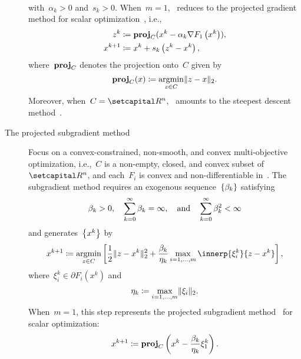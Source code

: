 \documentclass[../../main]{subfiles}
\begin{document}
\begin{example}
\begin{description}
\begin{equation}
\begin{aligned}
                \end{aligned}
            \end{equation} 
            with~$\alpha_k > 0$ and~$s_k > 0$.
            When~$m = 1$,~ reduces to the projected gradient method for scalar optimization~\cite{Polyak1963,Goldstein1964,Goldstein1967,McCormick1969}, i.e.,
            \begin{equation}
                \begin{aligned}
                    z^k &\coloneqq \proj_C (x^k - \alpha_k \nabla F_1\left(x^k\right)), \\
                    x^{k + 1} &\coloneqq x^k + s_k \left( z^k - x^k \right)
                ,\end{aligned}
            \end{equation} 
            where~$\proj_C$ denotes the projection onto~$C$ given by
            \begin{equation} \label{eq:proj}
                \proj_C(x) \coloneqq \argmin_{z \in C} \norm{z - x}_2
            .\end{equation} 
            Moreover, when~$C = \setR^n$,~ amounts to the steepest descent method~.
        \item[The projected subgradient method~\cite{Bello-Cruz2013}]
            Focus on a convex-constrained, non-smooth, and convex multi-objective optimization, i.e.,~$C$ is a non-empty, closed, and convex subset of~$\setR^n$, and each~$F_i$ is convex and non-differentiable in~.
            The subgradient method requires an exogenous sequence~$\set{\beta_k}$ satisfying
            \begin{equation}
                \beta_k > 0, \quad \sum_{k = 0}^{\infty} \beta_k = \infty, \eqand \sum_{k = 0}^{\infty} \beta_k^2 < \infty 
            \end{equation} 
            and generates~$\set*{x^k}$ by
            \begin{equation}
                    x^{k + 1} \coloneqq \argmin_{z \in C} \left[ \frac{1}{2} \norm{z - x^k}_2^2 + \frac{\beta_k}{\eta_k} \max_{i = 1, \dots, m} \innerp{\xi^k_i}{z - x^k} \right] 
            ,\end{equation} 
            where~$\xi^k_i \in \partial F_i\left(x^k\right)$ and
            \begin{equation}
                \eta_k \coloneqq \max_{i = 1, \dots, m} \norm{\xi_i}_2
            .\end{equation} 
            When~$m = 1$, this step represents the projected subgradient method~\cite{Polyak1967,Polyak1969,Shor1985,Alber1998,Alber2001} for scalar optimization:
            \begin{equation}
                x^{k + 1} \coloneqq \proj_C\left( x^k - \frac{\beta_k}{\eta_k} \xi^k_1 \right) 
            .\end{equation} 
    \end{description}
\end{example}
\end{document}
